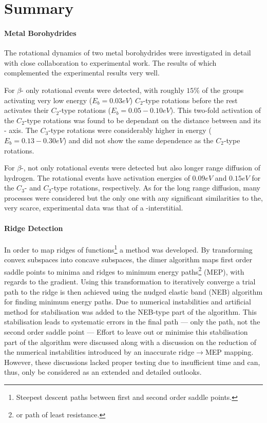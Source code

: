 \chapter{Summary}
\label{chap:summary}

\subsubsection{Metal Borohydrides}
The rotational dynamics of two metal borohydrides were investigated in detail with close collaboration to experimental work.
The results of which complemented the experimental results very well.

For $\beta$- only rotational events were detected, with roughly $15\%$ of the  groups activating very low energy ($E_b = 0.03\unit{eV}$) $C_2$-type rotations before the rest activates their $C_2$-type rotations ($E_b = 0.05 - 0.10 \unit{eV}$).
This two-fold activation of the $C_2$-type rotations was found to be dependant on the distance between  and its - axis.
The $C_3$-type rotations were considerably higher in energy ($E_b = 0.13 - 0.30 \unit{eV}$) and did not show the same dependence as the $C_2$-type rotations.

For $\beta$-, not only rotational events were detected but also longer range diffusion of hydrogen.
The rotational events have activation energies of $0.09 \unit{eV}$ and $0.15\unit{eV}$ for the $C_3$- and $C_2$-type rotations, respectively.
As for the long range diffusion, many processes were considered but the only one with any significant similarities to the, very scarce, experimental data was that of a -interstitial.

\subsubsection{Ridge Detection}
In order to map ridges of functions\footnote{Steepest descent paths between first and second order saddle points.} a method was developed.
By transforming convex subspaces into concave subspaces, the dimer algorithm maps first order saddle points to minima and ridges to minimum energy paths\footnote{or path of least resistance.} (MEP), with regards to the gradient.
Using this transformation to iteratively converge a trial path to the ridge is then achieved using the nudged elastic band (NEB) algorithm for finding minimum energy paths.
Due to numerical instabilities and artificial method for stabilisation was added to the NEB-type part of the algorithm.
This stabilisation leads to systematic errors in the final path --- only the path, not the second order saddle point ---
Effort to leave out or minimise this stabilisation part of the algorithm were discussed along with a discussion on the reduction of the numerical instabilities introduced by an inaccurate ridge$\rightarrow$MEP mapping.
However, these discussions lacked proper testing due to insufficient time and can, thus, only be considered as an extended and detailed outlooks.

